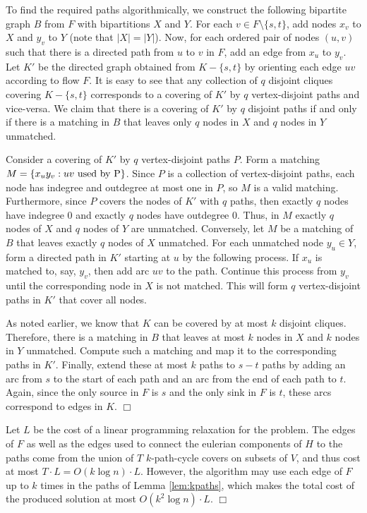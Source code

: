 \documentclass[11pt]{article}
\newcommand{\qed}{\hspace*{\fill}$\Box$}
\newenvironment{proof}[1][Proof. ]{\noindent {\bf #1 }}{\qed}
\newenvironment{proofof}[1]{\medskip \noindent {\bf{Proof of #1. }}}{\qed}
\begin{document}
\begin{proof}
To find the required paths algorithmically, we construct the following bipartite graph $B$ from $F$ with bipartitions $X$ and $Y$. For each $v \in F \setminus \{s,t\}$, add nodes $x_v$ to $X$ and $y_v$ to $Y$ (note that $|X| = |Y|$). Now, for each ordered pair of nodes $(u,v)$ such that there is a directed path from $u$ to $v$ in $F$, add an edge from $x_u$ to $y_v$. Let $K'$ be the directed graph obtained from $K-\{s,t\}$ by orienting each edge $uv$ according to flow $F$. It is easy to see that any collection of $q$ disjoint cliques covering $K-\{s,t\}$ corresponds to a covering of $K'$ by $q$ vertex-disjoint paths and vice-versa. We claim that there is a covering of $K'$ by $q$ disjoint paths if and only if there is a matching in $B$ that leaves only $q$ nodes in $X$ and $q$ nodes in $Y$ unmatched.

Consider a covering of $K'$ by $q$ vertex-disjoint paths $P$. Form a matching $M = \{x_uy_v : uv \rm{~used~by~} P\}$.
Since $P$ is a collection of vertex-disjoint paths, each node has indegree and outdegree at most one in $P$, so
$M$ is a valid matching. Furthermore, since $P$ covers the nodes of $K'$ with $q$ paths, then exactly $q$ nodes
have indegree 0 and exactly $q$ nodes have outdegree 0. Thus, in $M$ exactly $q$ nodes of $X$ and $q$ nodes of $Y$ are unmatched.
Conversely, let $M$ be a matching of $B$ that leaves exactly $q$ nodes of $X$ unmatched. For each unmatched node $y_u \in Y$,
form a directed path in $K'$ starting at $u$ by the following process. If $x_u$ is matched to, say, $y_v$, then add arc $uv$
to the path. Continue this process from $y_v$ until the corresponding node in $X$ is not matched. This will
form $q$ vertex-disjoint paths in $K'$ that cover all nodes.

As noted earlier, we know that $K$ can be covered by at most $k$ disjoint cliques. Therefore, there is a matching in $B$ that
leaves at most $k$ nodes in $X$ and $k$ nodes in $Y$ unmatched. Compute such a matching and map it to the corresponding paths
in $K'$. Finally, extend these at most $k$ paths to $s-t$ paths by adding an arc from $s$ to the start of each path and an arc
from the end of each path to $t$. Again, since the only source in $F$ is $s$ and the only sink in $F$ is $t$, these arcs correspond
to edges in $K$.
\end{proof}

\begin{proofof}{Theorem \ref{thm:kperson}}
Let $L$ be the cost of a linear programming relaxation for the problem. 
The edges of $F$ as well as the edges used to connect the eulerian components of $H$ to the paths come from the union of $T$ $k$-path-cycle covers on subsets of $V$, and thus cost at most $T\cdot L = O(k\log n)\cdot L$. However, the algorithm may use each edge of $F$ up to $k$ times in the paths of Lemma \ref{lem:kpaths}, which makes the total cost of the produced solution at most $O(k^2 \log n)\cdot L$.
\end{proofof}
\end{document}
